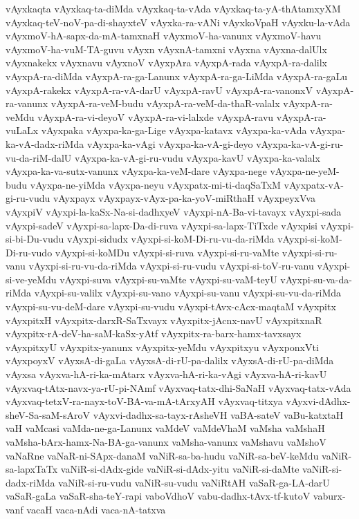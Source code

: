 {vAyxkaqta
vAyxkaq-ta-diMda
vAyxkaq-ta-vAda
vAyxkaq-ta-yA-thAtamxyXM
vAyxkaq-teV-noV-pa-di-shayxteV
vAyxka-ra-vANi
vAyxkoVpaH
vAyxku-la-vAda
vAyxmoV-hA-sapx-da-mA-tamxnaH
vAyxmoV-ha-vanunx
vAyxmoV-havu
vAyxmoV-ha-vuM-TA-guvu
vAyxn
vAyxnA-tamxni
vAyxna
vAyxna-dalUlx
vAyxnakekx
vAyxnavu
vAyxnoV
vAyxpAra
vAyxpA-rada
vAyxpA-ra-dalilx
vAyxpA-ra-diMda
vAyxpA-ra-ga-Lanunx
vAyxpA-ra-ga-LiMda
vAyxpA-ra-gaLu
vAyxpA-rakekx
vAyxpA-ra-vA-darU
vAyxpA-ravU
vAyxpA-ra-vanonxV
vAyxpA-ra-vanunx
vAyxpA-ra-veM-budu
vAyxpA-ra-veM-da-thaR-valalx
vAyxpA-ra-veMdu
vAyxpA-ra-vi-deyoV
vAyxpA-ra-vi-lalxde
vAyxpA-ravu
vAyxpA-ra-vuLaLx
vAyxpaka
vAyxpa-ka-ga-Lige
vAyxpa-katavx
vAyxpa-ka-vAda
vAyxpa-ka-vA-dadx-riMda
vAyxpa-ka-vAgi
vAyxpa-ka-vA-gi-deyo
vAyxpa-ka-vA-gi-ru-vu-da-riM-dalU
vAyxpa-ka-vA-gi-ru-vudu
vAyxpa-kavU
vAyxpa-ka-valalx
vAyxpa-ka-va-sutx-vanunx
vAyxpa-ka-veM-dare
vAyxpa-nege
vAyxpa-ne-yeM-budu
vAyxpa-ne-yiMda
vAyxpa-neyu
vAyxpatx-mi-ti-daqSaTxM
vAyxpatx-vA-gi-ru-vudu
vAyxpayx
vAyxpayx-vAyx-pa-ka-yoV-miRthaH
vAyxpeyxVva
vAyxpiV
vAyxpi-la-kaSx-Na-si-dadhxyeV
vAyxpi-nA-Ba-vi-tavayx
vAyxpi-sada
vAyxpi-sadeV
vAyxpi-sa-lapx-Da-di-ruva
vAyxpi-sa-lapx-TiTxde
vAyxpisi
vAyxpi-si-bi-Du-vudu
vAyxpi-sidudx
vAyxpi-si-koM-Di-ru-vu-da-riMda
vAyxpi-si-koM-Di-ru-vudo
vAyxpi-si-koMDu
vAyxpi-si-ruva
vAyxpi-si-ru-vaMte
vAyxpi-si-ru-vanu
vAyxpi-si-ru-vu-da-riMda
vAyxpi-si-ru-vudu
vAyxpi-si-toV-ru-vanu
vAyxpi-si-ve-yeMdu
vAyxpi-suva
vAyxpi-su-vaMte
vAyxpi-su-vaM-teyU
vAyxpi-su-va-da-riMda
vAyxpi-su-valilx
vAyxpi-su-vano
vAyxpi-su-vanu
vAyxpi-su-vu-da-riMda
vAyxpi-su-vu-deM-dare
vAyxpi-su-vudu
vAyxpi-tAvx-cAcx-maqtaM
vAyxpitx
vAyxpitxH
vAyxpitx-darxR-SaTxvayx
vAyxpitx-jAcnx-navU
vAyxpitxnaR
vAyxpitx-rA-deV-ha-saM-kaSx-yAtf
vAyxpitx-ra-barx-hamx-tavxsayx
vAyxpitxyU
vAyxpitx-yanunx
vAyxpitx-yeMdu
vAyxpitxyu
vAyxponxVti
vAyxpoyxV
vAyxsA-di-gaLa
vAyxsA-di-rU-pa-dalilx
vAyxsA-di-rU-pa-diMda
vAyxsa
vAyxva-hA-ri-ka-mAtarx
vAyxva-hA-ri-ka-vAgi
vAyxva-hA-ri-kavU
vAyxvaq-tAtx-navx-ya-rU-pi-NAmf
vAyxvaq-tatx-dhi-SaNaH
vAyxvaq-tatx-vAda
vAyxvaq-tetxV-ra-nayx-toV-BA-va-mA-tArxyAH
vAyxvaq-titxya
vAyxvi-dAdhx-sheV-Sa-saM-sAroV
vAyxvi-dadhx-sa-tayx-rAsheVH
vaBA-sateV
vaBu-katxtaH
vaH
vaMcasi
vaMda-ne-ga-Lanunx
vaMdeV
vaMdeVhaM
vaMsha
vaMshaH
vaMsha-bArx-hamx-Na-BA-ga-vanunx
vaMsha-vanunx
vaMshavu
vaMshoV
vaNaRne
vaNaR-ni-SApx-danaM
vaNiR-sa-ba-hudu
vaNiR-sa-beV-keMdu
vaNiR-sa-lapxTaTx
vaNiR-si-dAdx-gide
vaNiR-si-dAdx-yitu
vaNiR-si-daMte
vaNiR-si-dadx-riMda
vaNiR-si-ru-vudu
vaNiR-su-vudu
vaNiRtAH
vaSaR-ga-LA-darU
vaSaR-gaLa
vaSaR-sha-teY-rapi
vaboVdhoV
vabu-dadhx-tAvx-tf-kutoV
vaburx-vanf
vacaH
vaca-nAdi
vaca-nA-tatxva
}
